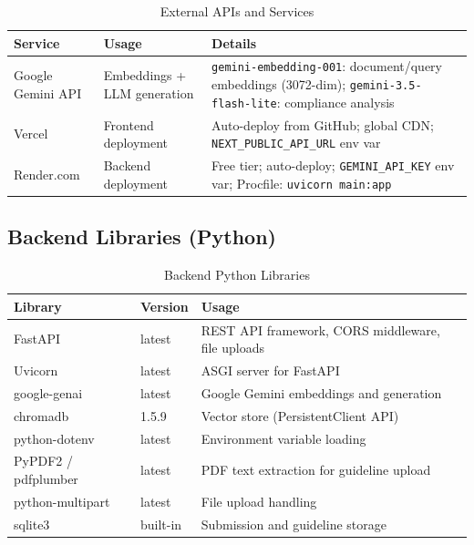 \documentclass[11pt,a4paper]{article}
\begin{document}
\begin{table}[H]
\centering
\begin{tabular}{p{} p{} p{}}
\toprule
\textbf{Service} & \textbf{Usage} & \textbf{Details} \\
\midrule
Google Gemini API & Embeddings + LLM generation & \texttt{gemini-embedding-001}: document/query embeddings (3072-dim); \texttt{gemini-3.5-flash-lite}: compliance analysis \\
\addlinespace
Vercel & Frontend deployment & Auto-deploy from GitHub; global CDN; \texttt{NEXT\_PUBLIC\_API\_URL} env var \\
\addlinespace
Render.com & Backend deployment & Free tier; auto-deploy; \texttt{GEMINI\_API\_KEY} env var; Procfile: \texttt{uvicorn main:app} \\
\bottomrule
\end{tabular}
\caption{External APIs and Services}
\end{table}

\subsection{Backend Libraries (Python)}

\begin{table}[H]
\centering
\begin{tabular}{p{} p{} p{}}
\toprule
\textbf{Library} & \textbf{Version} & \textbf{Usage} \\
\midrule
FastAPI & latest & REST API framework, CORS middleware, file uploads \\
\addlinespace
Uvicorn & latest & ASGI server for FastAPI \\
\addlinespace
google-genai & latest & Google Gemini embeddings and generation \\
\addlinespace
chromadb & 1.5.9 & Vector store (PersistentClient API) \\
\addlinespace
python-dotenv & latest & Environment variable loading \\
\addlinespace
PyPDF2 / pdfplumber & latest & PDF text extraction for guideline upload \\
\addlinespace
python-multipart & latest & File upload handling \\
\addlinespace
sqlite3 & built-in & Submission and guideline storage \\
\bottomrule
\end{tabular}
\caption{Backend Python Libraries}
\end{table}
\end{document}
